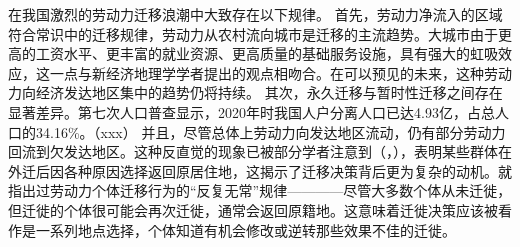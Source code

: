 \documentclass[master, final]{zufe-thesis}
\begin{document}
在我国激烈的劳动力迁移浪潮中大致存在以下规律。
首先，劳动力净流入的区域符合常识中的迁移规律，劳动力从农村流向城市是迁移的主流趋势。大城市由于更高的工资水平、更丰富的就业资源、更高质量的基础服务设施，具有强大的虹吸效应，这一点与新经济地理学学者提出的观点相吻合。在可以预见的未来，这种劳动力向经济发达地区集中的趋势仍将持续。
其次，永久迁移与暂时性迁移之间存在显著差异。第七次人口普查显示，2020年时我国人户分离人口已达4.93亿，占总人口的34.16\%。（xxx）
并且，尽管总体上劳动力向发达地区流动，仍有部分劳动力回流到欠发达地区。这种反直觉的现象已被部分学者注意到（\textcite{ShiZhiLeiJiaTingBingFuJiaTingJueCeYuNongCunQianYiLaoDongLiHuiLiu2012}，\textcite{RenYuanNongCunWaiChuLaoDongLiHuiLiuQianYiDeYingXiangYinSuHeHuiLiuXiaoYing2017}），表明某些群体在外迁后因各种原因选择返回原居住地，这揭示了迁移决策背后更为复杂的动机。\textcite{davanzoRepeatMigrationUnited1983}就指出过劳动力个体迁移行为的“反复无常”规律————尽管大多数个体从未迁徙，但迁徙的个体很可能会再次迁徙，通常会返回原籍地。这意味着迁徙决策应该被看作是一系列地点选择，个体知道有机会修改或逆转那些效果不佳的迁徙。
\end{document}
